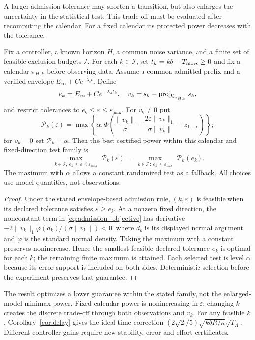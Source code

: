 A larger admission tolerance may shorten a transition, but also enlarges the uncertainty in the statistical test. This trade-off must be evaluated after recomputing the calendar. For a fixed calendar its protected power decreases with the tolerance.
\begin{proposition}\label{prop:controller}
Fix a controller, a known horizon $H$, a common noise variance, and a finite set of feasible exclusion budgets $\mathcal I$. For each $k\in\mathcal I$, set $t_k=k\delta-T_{\rm move}\ge0$ and fix a calendar $\pi_{H,k}$ before observing data. Assume a common admitted prefix and a verified envelope $E_\infty+Ce^{-\lambda_st}$. Define
\begin{equation}
 e_k=E_\infty+Ce^{-\lambda_st_k},\quad
 v_k=s_k-\operatorname{proj}_{\mathcal K_{\pi_{H,k}}}s_k,
\end{equation}
and restrict tolerances to $e_k\le\varepsilon\le\varepsilon_{\max}$. For $v_k\ne0$ put
\begin{equation}
 \mathcal P_k(\varepsilon)=\max\!\left\{\alpha,
 \Phi\!\left(\frac{\|v_k\|}{\sigma}
 -\frac{2\varepsilon\|v_k\|_1}{\sigma\|v_k\|}
 -z_{1-\alpha}\right)\right\};\label{eq:admission_objective}
\end{equation}
for $v_k=0$ set $\mathcal P_k=\alpha$. Then the best certified power within this calendar and fixed-direction test family is
\begin{equation}
 \max_{\substack{k\in\mathcal I,\ e_k\le\varepsilon\le\varepsilon_{\max}}}
 \mathcal P_k(\varepsilon)
 =\max_{\substack{k\in\mathcal I\,:\ e_k\le\varepsilon_{\max}}}
 \mathcal P_k(e_k).\label{eq:admission_opt}
\end{equation}
The maximum with $\alpha$ allows a constant randomized test as a fallback. All choices use model quantities, not observations.
\end{proposition}
\begin{proof}
Under the stated envelope-based admission rule, $(k,\varepsilon)$ is feasible when its declared tolerance satisfies $\varepsilon\ge e_k$. At a nonzero fixed direction, the nonconstant term in \eqref{eq:admission_objective} has derivative $-2\|v_k\|_1\varphi(d_k)/(\sigma\|v_k\|)<0$, where $d_k$ is its displayed normal argument and  $\varphi$ is the standard normal density. Taking the maximum with a constant preserves nonincrease. Hence the smallest feasible declared tolerance $e_k$ is optimal for each $k$; the remaining finite maximum is attained. Each selected test is level $\alpha$ because its error support is included on both sides. Deterministic selection before the experiment preserves that guarantee.\end{proof}
The result optimizes a lower guarantee within the stated family, not the enlarged-model minimax power. Fixed-calendar power is nonincreasing in $\varepsilon$; changing $k$ creates the discrete trade-off through both observations and $v_k$. For any feasible $k$, Corollary~\ref{cor:delay} gives the ideal time correction $(2\sqrt2/5)\sqrt{k\delta R/\kappa}\sqrt{T_\Lambda}$. Different controller gains require new stability, error and effort certificates.

